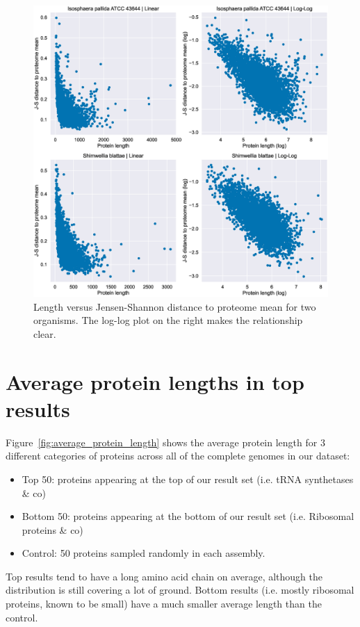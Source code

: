 \documentclass[12pt]{article}
\begin{document}
\begin{figure}[!htb]
\hspace*{-1.6cm}
\includegraphics[scale = .55]{length_vs_distance.eps}
\caption{Length versus Jensen-Shannon distance to proteome mean for two organisms. The log-log plot on the right makes the relationship clear.}
\label{fig:length_vs_distance}
\end{figure}

\section{Average protein lengths in top results}

Figure~\ref{fig:average_protein_length} shows the average protein length for 3 different categories of proteins across all of the complete genomes in our dataset:
%
\begin{itemize}
  \item Top 50: proteins appearing at the top of our result set (i.e. tRNA synthetases \& co)
  \item Bottom 50: proteins appearing at the bottom of our result set (i.e. Ribosomal proteins \& co)
  \item Control: 50 proteins sampled randomly in each assembly.
\end{itemize}
%
Top results tend to have a long amino acid chain on average, although the distribution is still covering a lot of ground. Bottom results (i.e. mostly ribosomal proteins, known to be small) have a much smaller average length than the control.
\end{document}
